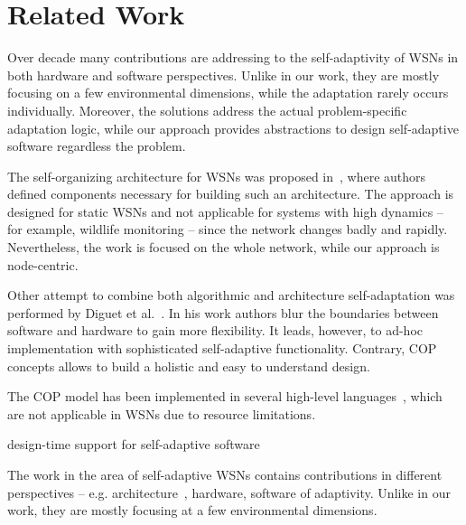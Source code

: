 \section{Related Work}\label{sec:related}

Over decade many contributions are addressing to the self-adaptivity of WSNs in
both hardware and software perspectives. Unlike in our work, they are mostly
focusing on a few environmental dimensions, while the adaptation rarely occurs
individually. Moreover, the solutions address the actual problem-specific
adaptation logic, while our approach provides abstractions to design
self-adaptive software regardless the problem.

The self-organizing architecture for WSNs was proposed in~\cite{Subramanian00},
where authors defined components necessary for building such an architecture.
The approach is designed for static WSNs and not applicable for systems with
high dynamics -- for example, wildlife monitoring -- since the network changes
badly and rapidly. Nevertheless, the work is focused on the whole network, while
our approach is node-centric.

Other attempt to combine both algorithmic and architecture self-adaptation was
performed by Diguet et al.~\cite{Diguet11}. In his work authors blur the
boundaries between software and hardware to gain more flexibility. It leads,
however, to ad-hoc implementation with sophisticated self-adaptive
functionality. Contrary, COP concepts allows to build a holistic and easy to
understand design.

The COP model has been implemented in several high-level languages~\cite{Bardram05,Ghezzi10,Kamina11,Salvaneschi12,Sehic11}, which are not applicable in WSNs due to resource limitations.

design-time support for self-adaptive software 

The work in the area of self-adaptive WSNs contains contributions in different perspectives -- e.g. architecture~\cite{}, hardware, software  of adaptivity. Unlike in our work, they are mostly focusing at a few environmental dimensions.
